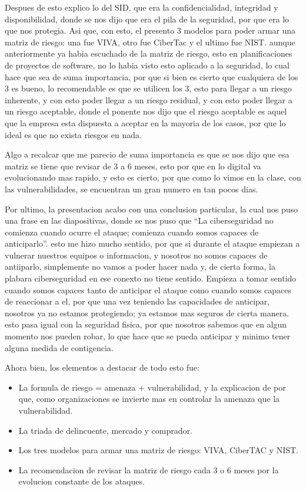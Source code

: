 \documentclass[letterpaper,12pt]{article}
\begin{document}
Despues de esto explico lo del SID, que era la confidencialidad, integridad y
disponibilidad, donde se nos dijo que era el pila de la seguridad, 
por que era lo que nos protegia. Asi que, con esto, el presento 3 modelos 
para poder armar una matriz de riesgo: una fue VIVA, otro fue 
CiberTac y el ultimo fue NIST. aunque anteriormente ya habia 
escuchado de la matriz de riesgo, esto en planificaciones de proyectos 
de software, no lo habia visto esto aplicado a la seguridad, 
lo cual hace que sea de suma importancia, por que 
si bien es cierto que cualquiera de los 3 es bueno, lo recomendable 
es que se utilicen los 3, esto para llegar a un riesgo 
inherente, y con esto poder llegar a un riesgo residual,
y con esto poder llegar a un riesgo aceptable, donde el ponente
nos dijo que el riesgo aceptable es aquel que la empresa esta dispuesta a aceptar en la mayoria 
de los casos, por que lo ideal es que no exista riesgos en nada.

Algo a recalcar que me parecio de suma importancia es que se nos dijo que esa matriz 
se tiene que revisar de 3 a 6 meses, esto por que en lo digital 
va evolucionando mas rapido, y esto es cierto, por que como lo vimos en la clase, 
con las vulnerabilidades, se encuentran un gran numero en tan pocos dias.

Por ultimo, la presentacion acabo con una conclusion particular, la cual 
nos puso una frase en las diapositivas, donde se nos puso que ``La ciberseguridad no comienza cuando ocurre el ataque; comienza cuando somos capaces de anticiparlo''.
esto me hizo mucho sentido, por que si durante el ataque empiezan 
a vulnerar nuestros equipos o informacion, 
y nosotros no somos capaces de antiiparlo,
simplemente no vamos a poder hacer nada y, de cierta forma, la plabara 
ciberseguridad en ese conexto no tiene sentido. Empieza a tomar sentido 
cuando somos capaces tanto de anticipar el ataque como 
cuando somos capaces de reaccionar a el, 
por que una vez teniendo las capacidades de anticipar, 
nosotros 
ya no estamos protegiendo; ya estamos mas seguros de cierta manera. 
esto pasa igual con la seguridad fisica, por que nosotros 
sabemos que en algun momento nos pueden robar, lo que hace que 
se pueda anticipar y minimo tener alguna medida de contigencia.

Ahora bien, los elementos a destacar de todo esto fue:

\begin{itemize}
  \item La formula de riesgo = amenaza + vulnerabilidad, y la explicacion de por que, como
  organizaciones se invierte mas en controlar la amenaza que la vulnerabilidad.
  \item La triada de delincuente, mercado y comprador.
  \item Los tres modelos para armar una matriz de riesgo: VIVA, CiberTAC y NIST.
  \item La recomendacion de revisar la matriz de riesgo cada 3 o 6 meses por la evolucion constante de los ataques.
\end{itemize}
\end{document}
